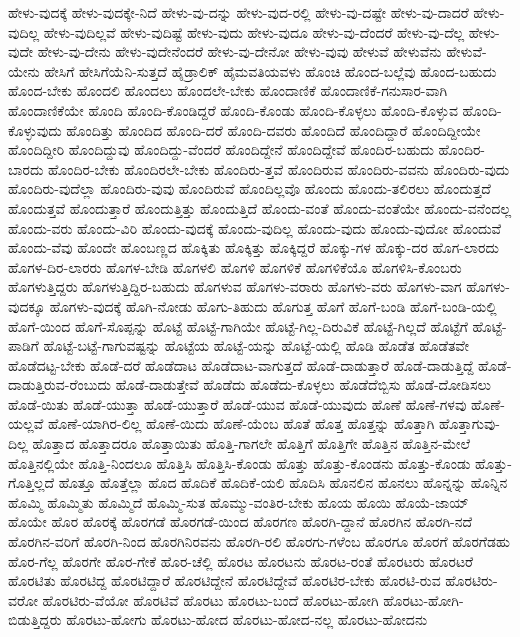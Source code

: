 {ಹೇಳು-ವುದಕ್ಕೆ
ಹೇಳು-ವುದಕ್ಕೇ-ನಿದೆ
ಹೇಳು-ವು-ದನ್ನು
ಹೇಳು-ವುದ-ರಲ್ಲಿ
ಹೇಳು-ವು-ದಷ್ಟೇ
ಹೇಳು-ವು-ದಾದರೆ
ಹೇಳು-ವುದಿಲ್ಲ
ಹೇಳು-ವುದಿಲ್ಲವೆ
ಹೇಳು-ವುದಿಷ್ಟೆ
ಹೇಳು-ವುದು
ಹೇಳು-ವುದೂ
ಹೇಳು-ವು-ದೆಂದರೆ
ಹೇಳು-ವು-ದೆಲ್ಲ
ಹೇಳು-ವುದೇ
ಹೇಳು-ವು-ದೇನು
ಹೇಳು-ವುದೇನೆಂದರೆ
ಹೇಳು-ವು-ದೇನೋ
ಹೇಳು-ವುವು
ಹೇಳುವೆ
ಹೇಳುವೆನು
ಹೇಳುವೆ-ಯೇನು
ಹೇಸಿಗೆ
ಹೇಸಿಗೆಯೆನಿ-ಸುತ್ತದೆ
ಹೈಡ್ರಾಲಿಕ್
ಹೈಮವತಿಯವಳು
ಹೊಂಚಿ
ಹೊಂದ-ಬಲ್ಲೆವು
ಹೊಂದ-ಬಹುದು
ಹೊಂದ-ಬೇಕು
ಹೊಂದಲಿ
ಹೊಂದಲು
ಹೊಂದಲೇ-ಬೇಕು
ಹೊಂದಾಣಿಕೆ
ಹೊಂದಾಣಿಕೆ-ಗನುಸಾರ-ವಾಗಿ
ಹೊಂದಾಣಿಕೆಯೇ
ಹೊಂದಿ
ಹೊಂದಿ-ಕೊಂಡಿದ್ದರೆ
ಹೊಂದಿ-ಕೊಂಡು
ಹೊಂದಿ-ಕೊಳ್ಳಲು
ಹೊಂದಿ-ಕೊಳ್ಳುವ
ಹೊಂದಿ-ಕೊಳ್ಳುವುದು
ಹೊಂದಿತ್ತು
ಹೊಂದಿದ
ಹೊಂದಿ-ದರೆ
ಹೊಂದಿ-ದವರು
ಹೊಂದಿದೆ
ಹೊಂದಿದ್ದಾರೆ
ಹೊಂದಿದ್ದೀಯೇ
ಹೊಂದಿದ್ದೀರಿ
ಹೊಂದಿದ್ದುವು
ಹೊಂದಿದ್ದು-ವೆಂದರೆ
ಹೊಂದಿದ್ದೇನೆ
ಹೊಂದಿದ್ದೇವೆ
ಹೊಂದಿರ-ಬಹುದು
ಹೊಂದಿರ-ಬಾರದು
ಹೊಂದಿರ-ಬೇಕು
ಹೊಂದಿರಲೇ-ಬೇಕು
ಹೊಂದಿರು-ತ್ತವೆ
ಹೊಂದಿರುವ
ಹೊಂದಿರು-ವವನು
ಹೊಂದಿರು-ವುದು
ಹೊಂದಿರು-ವುದೆಲ್ಲಾ
ಹೊಂದಿರು-ವುವು
ಹೊಂದಿರುವೆ
ಹೊಂದಿಲ್ಲವೊ
ಹೊಂದು
ಹೊಂದು-ತಲಿರಲು
ಹೊಂದುತ್ತದೆ
ಹೊಂದುತ್ತವೆ
ಹೊಂದುತ್ತಾರೆ
ಹೊಂದುತ್ತಿತ್ತು
ಹೊಂದುತ್ತಿದೆ
ಹೊಂದು-ವಂತೆ
ಹೊಂದು-ವಂತೆಯೇ
ಹೊಂದು-ವನೆಂದಲ್ಲ
ಹೊಂದು-ವರು
ಹೊಂದು-ವಿರಿ
ಹೊಂದು-ವುದಕ್ಕೆ
ಹೊಂದು-ವುದಿಲ್ಲ
ಹೊಂದು-ವುದು
ಹೊಂದು-ವುದೋ
ಹೊಂದುವೆ
ಹೊಂದು-ವೆವು
ಹೊಂದೇ
ಹೊಂಬಣ್ಣದ
ಹೊಕ್ಕಿತು
ಹೊಕ್ಕಿತ್ತು
ಹೊಕ್ಕಿದ್ದರೆ
ಹೊಕ್ಕು-ಗಳ
ಹೊಕ್ಕು-ದರ
ಹೊಗ-ಲಾರದು
ಹೊಗಳ-ದಿರ-ಲಾರರು
ಹೊಗಳ-ಬೇಡಿ
ಹೊಗಳಲಿ
ಹೊಗಳಿ
ಹೊಗಳಿಕೆ
ಹೊಗಳಿಕೆಯೊ
ಹೊಗಳಿಸಿ-ಕೊಂಬರು
ಹೊಗಳುತ್ತಿದ್ದರು
ಹೊಗಳುತ್ತಿದ್ದಿರ-ಬಹುದು
ಹೊಗಳುವ
ಹೊಗಳು-ವರಾರು
ಹೊಗಳು-ವರು
ಹೊಗಳು-ವಾಗ
ಹೊಗಳು-ವುದಕ್ಕೂ
ಹೊಗಳು-ವುದಕ್ಕೆ
ಹೊಗಿ-ನೋಡು
ಹೊಗು-ತಿಹುದು
ಹೊಗುತ್ತ
ಹೊಗೆ
ಹೊಗೆ-ಬಂಡಿ
ಹೊಗೆ-ಬಂಡಿ-ಯಲ್ಲಿ
ಹೊಗೆ-ಯಿಂದ
ಹೊಗೆ-ಸೊಪ್ಪನ್ನು
ಹೊಟ್ಟೆ
ಹೊಟ್ಟೆ-ಗಾಗಿಯೇ
ಹೊಟ್ಟೆ-ಗಿಲ್ಲ-ದಿರುವಿಕೆ
ಹೊಟ್ಟೆ-ಗಿಲ್ಲದೆ
ಹೊಟ್ಟೆಗೆ
ಹೊಟ್ಟೆ-ಪಾಡಿಗೆ
ಹೊಟ್ಟೆ-ಬಟ್ಟೆ-ಗಾಗುವಷ್ಟನ್ನು
ಹೊಟ್ಟೆಯ
ಹೊಟ್ಟೆ-ಯನ್ನು
ಹೊಟ್ಟೆ-ಯಲ್ಲಿ
ಹೊಡಿ
ಹೊಡೆತ
ಹೊಡೆತವೇ
ಹೊಡೆದಟ್ಟ-ಬೇಕು
ಹೊಡೆ-ದರೆ
ಹೊಡೆದಾಟ
ಹೊಡೆದಾಟ-ವಾಗುತ್ತದೆ
ಹೊಡೆ-ದಾಡುತ್ತಾರೆ
ಹೊಡೆ-ದಾಡುತ್ತಿದ್ದೆ
ಹೊಡೆ-ದಾಡುತ್ತಿರುವ-ರೆಂಬುದು
ಹೊಡೆ-ದಾಡುತ್ತೇವೆ
ಹೊಡೆದು
ಹೊಡೆದು-ಕೊಳ್ಳಲು
ಹೊಡೆದೆಬ್ಬಿಸು
ಹೊಡೆ-ದೋಡಿಸಲು
ಹೊಡೆ-ಯಿತು
ಹೊಡೆ-ಯುತ್ತಾ
ಹೊಡೆ-ಯುತ್ತಾರೆ
ಹೊಡೆ-ಯುವ
ಹೊಡೆ-ಯುವುದು
ಹೊಣೆ
ಹೊಣೆ-ಗಳವು
ಹೊಣೆ-ಯಲ್ಲವೆ
ಹೊಣೆ-ಯಾಗಿರ-ಲಿಲ್ಲ
ಹೊಣೆ-ಯಿದು
ಹೊಣೆ-ಯೆಂಬ
ಹೊತೆ
ಹೊತ್ತ
ಹೊತ್ತನ್ನು
ಹೊತ್ತಾಗಿ
ಹೊತ್ತಾಗುವು-ದಿಲ್ಲ
ಹೊತ್ತಾದ
ಹೊತ್ತಾದರೂ
ಹೊತ್ತಾಯಿತು
ಹೊತ್ತಿ-ಗಾಗಲೇ
ಹೊತ್ತಿಗೆ
ಹೊತ್ತಿಗೇ
ಹೊತ್ತಿನ
ಹೊತ್ತಿನ-ಮೇಲೆ
ಹೊತ್ತಿನಲ್ಲಿಯೇ
ಹೊತ್ತಿ-ನಿಂದಲೂ
ಹೊತ್ತಿಸಿ
ಹೊತ್ತಿಸಿ-ಕೊಂಡು
ಹೊತ್ತು
ಹೊತ್ತು-ಕೊಂಡನು
ಹೊತ್ತು-ಕೊಂಡು
ಹೊತ್ತು-ಗೊತ್ತಿಲ್ಲದೆ
ಹೊತ್ತೂ
ಹೊತ್ತೆಲ್ಲಾ
ಹೊದ
ಹೊದಿಕೆ
ಹೊದಿಕೆ-ಯಲಿ
ಹೊದಿಸಿ
ಹೊನಲಿನ
ಹೊನಲು
ಹೊನ್ನನ್ನು
ಹೊನ್ನಿನ
ಹೊಮ್ಮಿ
ಹೊಮ್ಮಿತು
ಹೊಮ್ಮಿದೆ
ಹೊಮ್ಮಿ-ಸುತ
ಹೊಮ್ಮು-ವಂತಿರ-ಬೇಕು
ಹೊಯ
ಹೊಯಿ
ಹೊಯೆ-ಜಾಯ್
ಹೊಯೇ
ಹೊರ
ಹೊರಕ್ಕೆ
ಹೊರಗಡೆ
ಹೊರಗಡೆ-ಯಿಂದ
ಹೊರಗಣ
ಹೊರಗಿ-ದ್ದಾನೆ
ಹೊರಗಿನ
ಹೊರಗಿ-ನದೆ
ಹೊರಗಿನ-ವರಿಗೆ
ಹೊರಗಿ-ನಿಂದ
ಹೊರಗಿನಿರವನು
ಹೊರಗಿ-ರಲಿ
ಹೊರಗು-ಗಳೆಂಬ
ಹೊರಗೂ
ಹೊರಗೆ
ಹೊರಗೆಡಹು
ಹೊರ-ಗೆಲ್ಲ
ಹೊರಗೇ
ಹೊರ-ಗೇಕೆ
ಹೊರ-ಚೆಲ್ಲಿ
ಹೊರಟ
ಹೊರಟನು
ಹೊರಟ-ರಂತೆ
ಹೊರಟರು
ಹೊರಟರೆ
ಹೊರಟಿತು
ಹೊರಟಿದ್ದ
ಹೊರಟಿದ್ದಾರೆ
ಹೊರಟಿದ್ದೇನೆ
ಹೊರಟಿದ್ದೇವೆ
ಹೊರಟಿರ-ಬೇಕು
ಹೊರಟಿ-ರುವ
ಹೊರಟಿರು-ವರೋ
ಹೊರಟಿರು-ವೆಯೋ
ಹೊರಟಿವೆ
ಹೊರಟು
ಹೊರಟು-ಬಂದೆ
ಹೊರಟು-ಹೋಗಿ
ಹೊರಟು-ಹೋಗಿ-ಬಿಡುತ್ತಿದ್ದರು
ಹೊರಟು-ಹೋಗು
ಹೊರಟು-ಹೋದ
ಹೊರಟು-ಹೋದ-ನಲ್ಲ
ಹೊರಟು-ಹೋದನು
}
